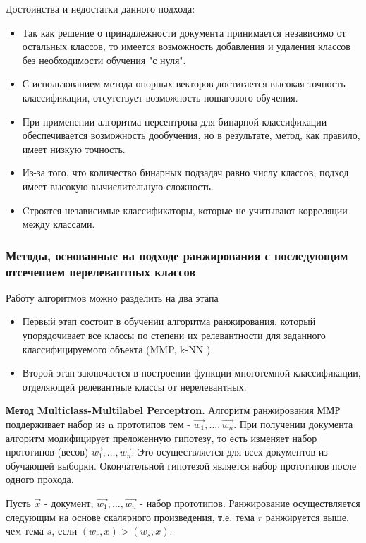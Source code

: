 \documentclass[russian, utf8, emptystyle]{eskdtext}
\begin{document}
Достоинства и недостатки данного подхода:
\begin{itemize}
	\item Так как решение о принадлежности документа принимается независимо от остальных классов, то имеется возможность добавления и удаления классов без необходимости обучения "с нуля".
	\item С использованием метода опорных векторов достигается высокая точность классификации, отсутствует возможность пошагового обучения.
	\item При применении алгоритма персептрона для бинарной классификации обеспечивается возможность дообучения, но в результате, метод, как правило, имеет низкую точность.
	\item Из-за того, что количество бинарных подзадач равно числу классов, подход имеет высокую вычислительную сложность.
	\item Cтроятся независимые классификаторы, которые не учитывают корреляции между классами.
\end{itemize}
\subsubsection{Методы, основанные на подходе ранжирования с последующим отсечением нерелевантных классов}
Работу алгоритмов можно разделить на два этапа
\begin{itemize}
	\item Первый этап состоит в обучении алгоритма ранжирования, который упорядочивает все классы по степени их релевантности для заданного классифицируемого объекта (MMP\cite{MMP1,MMP2}, k-NN \cite{kNN3}).
	\item Второй этап заключается в построении функции многотемной классификации, отделяющей релевантные классы от нерелевантных.
\end{itemize}

{\bf Метод Multiclass-Multilabel Perceptron.} Алгоритм ранжирования ММР поддерживает набор из n прототипов тем - $\vec{w_1},\ldots,\vec{w_n}$. При получении документа алгоритм модифицирует преложенную гипотезу, то есть изменяет набор прототипов (весов) $\vec{w_1},\ldots,\vec{w_n}$. Это осуществляется для всех документов из обучающей выборки. Окончательной гипотезой является набор прототипов после одного прохода.

Пусть $\vec{x}$ - документ, $\vec{w_1},\ldots,\vec{w_n}$ - набор прототипов. Ранжирование осуществляется следующим на основе скалярного произведения, т.е. тема $r$ ранжируется выше, чем тема $s$, если $(w_r,x)>(w_s,x)$.
\end{document}
